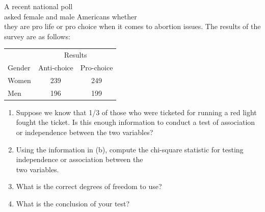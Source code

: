 \documentclass[11pt, chapterprefix=true]{scrbook}\usepackage[]{graphicx}\usepackage[]{color}
\begin{document}
\begin{exercises}
\begin{exercise}
\end{exercise}
\begin{solution} %

\end{solution}

\begin{exercise} %

A recent national poll \\ asked female and male Americans whether \\ they are pro life or pro choice when it comes to abortion issues.  The results of the survey are as follows: 

\begin{table}[ht]
\centering
\begin{tabular}{@{} lcc @{}} \hline
& \multicolumn{2}{c}{Results} \\
Gender & Anti-choice & Pro-choice  \\ \hline
Women  & 239 & 249   \\
Men   & 196 & 199   \\ \hline
\end{tabular}
\end{table}

\begin{enumerate}
 
  \item Suppose we know that 1/3 of those who were ticketed for running a red light \\ fought the ticket.  Is this enough information to conduct a test of association or independence between the two variables?
  \item Using the information in (b), compute the chi-square statistic for testing independence or association between the \\ two variables.
  \item What is the correct degrees of freedom to use?
  \item What is the conclusion of your test?
\end{enumerate}

\end{exercise}
\begin{solution} %

\end{solution}



\end{exercises}

\onecolumn
\end{document}
